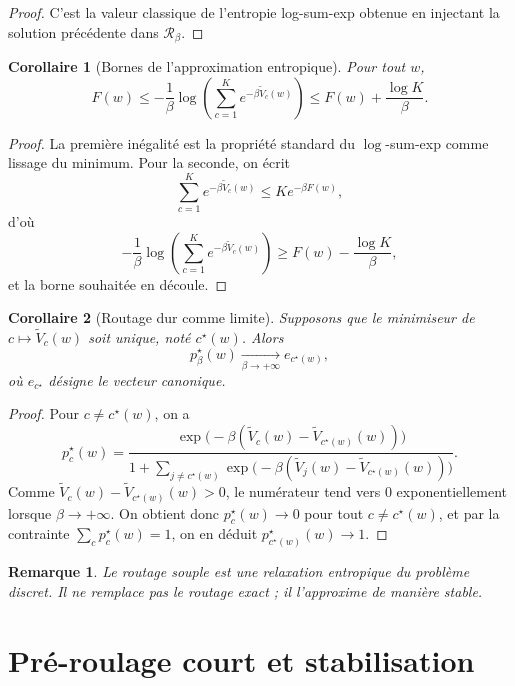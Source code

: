 \documentclass[11pt,a4paper]{article}
\newtheorem{corollary}{Corollaire}[section]
\newtheorem{remark}{Remarque}[section]
\newcommand{\Rcal}{\mathcal R}
\begin{document}
\begin{proof}
C'est la valeur classique de l'entropie log-sum-exp obtenue en injectant la solution précédente dans \(\Rcal_\beta\).
\end{proof}

\begin{corollary}[Bornes de l'approximation entropique]
Pour tout \(w\),
\[
F(w)
\le
-\frac{1}{\beta}\log\!\left(\sum_{c=1}^K e^{-\beta \widetilde V_c(w)}\right)
\le
F(w)+\frac{\log K}{\beta}.
\]
\end{corollary}

\begin{proof}
La première inégalité est la propriété standard du \(\log\)-sum-exp comme lissage du minimum. Pour la seconde, on écrit
\[
\sum_{c=1}^K e^{-\beta \widetilde V_c(w)}
\le
K e^{-\beta F(w)},
\]
d'où
\[
-\frac{1}{\beta}\log\!\left(\sum_{c=1}^K e^{-\beta \widetilde V_c(w)}\right)
\ge
F(w)-\frac{\log K}{\beta},
\]
et la borne souhaitée en découle.
\end{proof}

\begin{corollary}[Routage dur comme limite]
Supposons que le minimiseur de \(c\mapsto \widetilde V_c(w)\) soit unique, noté \(c^\star(w)\). Alors
\[
p^\star_\beta(w)\xrightarrow[\beta\to+\infty]{} e_{c^\star(w)},
\]
où \(e_{c^\star}\) désigne le vecteur canonique.
\end{corollary}

\begin{proof}
Pour \(c\neq c^\star(w)\), on a
\[
p_c^\star(w)
=
\frac{\exp\!\bigl(-\beta(\widetilde V_c(w)-\widetilde V_{c^\star(w)}(w))\bigr)}
{1+\sum_{j\neq c^\star(w)}\exp\!\bigl(-\beta(\widetilde V_j(w)-\widetilde V_{c^\star(w)}(w))\bigr)}.
\]
Comme \(\widetilde V_c(w)-\widetilde V_{c^\star(w)}(w)>0\), le numérateur tend vers \(0\) exponentiellement lorsque \(\beta\to+\infty\). On obtient donc \(p_c^\star(w)\to0\) pour tout \(c\neq c^\star(w)\), et par la contrainte \(\sum_c p_c^\star(w)=1\), on en déduit \(p_{c^\star(w)}^\star(w)\to1\).
\end{proof}

\begin{remark}
Le routage souple est une relaxation entropique du problème discret. Il ne remplace pas le routage exact ; il l'approxime de manière stable.
\end{remark}

\section{Pré-roulage court et stabilisation}
\end{document}
